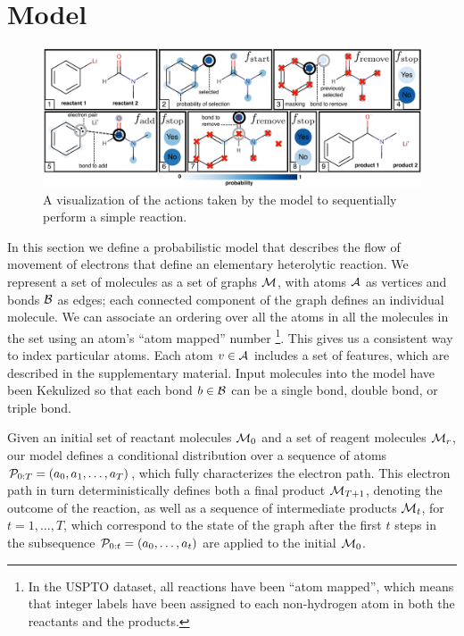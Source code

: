 
\section{Model}



\begin{figure}
\centering
\includegraphics[width=\textwidth]{reaction_model_blue}
\caption{A visualization of the actions taken by the model to sequentially perform a simple reaction.}
\label{fig:reaction_model}
\end{figure}



In this section we define a probabilistic model that describes the flow of movement of electrons that define an elementary heterolytic reaction.
We represent a set of molecules as a set of graphs ${\mathcal{M}}$, with atoms ${\mathcal{A}}$ as vertices and bonds ${\mathcal{B}}$ as edges;
each connected component of the graph defines an individual molecule.
We can associate an ordering over all the atoms in all the molecules in the set using an atom's ``atom mapped'' number \footnote{In the USPTO dataset, all reactions have been ``atom mapped'', which means that integer labels have been assigned to each non-hydrogen atom in both the reactants and the products.}. This gives us a consistent way to index particular atoms.
Each atom $v \in {\mathcal{A}}$ includes a set of features, which are described in the supplementary material.
Input molecules into the model have been Kekulized  so that each bond $b \in {\mathcal{B}}$ can be a single bond, double bond, or triple bond.





Given an initial set of reactant molecules ${\mathcal{M}}_0$ and a set of reagent molecules ${\mathcal{M}}_r$, 
our model defines a conditional distribution over a sequence of atoms ${\mathcal{P}}_{0:T} = (a_0, a_1, \ldots, a_T)$,
which fully characterizes the electron path.
This electron path in turn deterministically defines both a final product ${\mathcal{M}}_{T+1}$, 
denoting the outcome of the reaction,
as well as a sequence of intermediate products ${\mathcal{M}}_t$, for $t = 1,\dots,T$,
which correspond to the state of the graph after the first $t$ steps in the subsequence ${\mathcal{P}}_{0:t} = (a_0, \dots, a_t)$ are applied to the initial ${\mathcal{M}}_0$.


